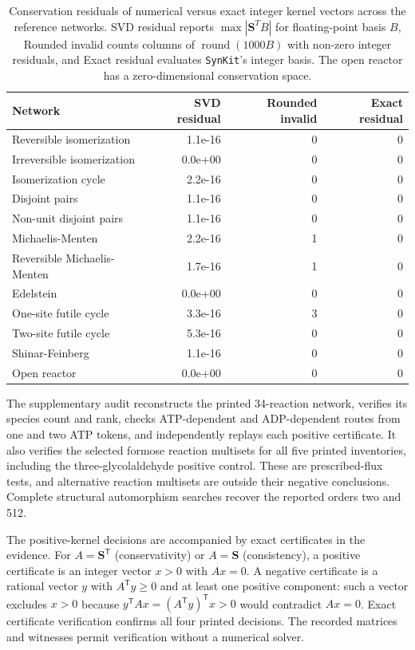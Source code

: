 \documentclass[pdflatex,referee]{../template/sn-jnl}
\theoremstyle{plain}%
\theoremstyle{definition}%
\theoremstyle{remark}%
\newcommand{\synkit}{\texttt{SynKit}\xspace}
\begin{document}
\begin{table}[htbp]
\centering
\caption{Conservation residuals of numerical versus exact integer kernel vectors across the reference networks. SVD residual reports $\max|\mathbf S^TB|$ for floating-point basis $B$, Rounded invalid counts columns of $\operatorname{round}(1000B)$ with non-zero integer residuals, and Exact residual evaluates \synkit's integer basis. The open reactor has a zero-dimensional conservation space.}
\label{tab:numerical_audit}
\small
\begin{tabular}{@{}lrrr@{}}
\toprule
Network & SVD residual & Rounded invalid & Exact residual\\
\midrule
Reversible isomerization & 1.1e-16 & 0 & 0 \\
Irreversible isomerization & 0.0e+00 & 0 & 0 \\
Isomerization cycle & 2.2e-16 & 0 & 0 \\
Disjoint pairs & 1.1e-16 & 0 & 0 \\
Non-unit disjoint pairs & 1.1e-16 & 0 & 0 \\
Michaelis-Menten & 2.2e-16 & 1 & 0 \\
Reversible Michaelis-Menten & 1.7e-16 & 1 & 0 \\
Edelstein & 0.0e+00 & 0 & 0 \\
One-site futile cycle & 3.3e-16 & 3 & 0 \\
Two-site futile cycle & 5.3e-16 & 0 & 0 \\
Shinar-Feinberg & 1.1e-16 & 0 & 0 \\
Open reactor & 0.0e+00 & 0 & 0 \\
\bottomrule
\end{tabular}
\end{table}

The supplementary audit reconstructs the printed 34-reaction network, verifies its species count and rank, checks ATP-dependent and ADP-dependent routes from one and two ATP tokens, and independently replays each positive certificate. It also verifies the selected formose reaction multisets for all five printed inventories, including the three-glycolaldehyde positive control. These are prescribed-flux tests, and alternative reaction multisets are outside their negative conclusions. Complete structural automorphism searches recover the reported orders two and 512.

The positive-kernel decisions are accompanied by exact certificates in the evidence. For $A=\mathbf S^{\mathsf T}$ (conservativity) or $A=\mathbf S$ (consistency), a positive certificate is an integer vector $x>0$ with $Ax=0$. A negative certificate is a rational vector $y$ with $A^{\mathsf T}y\ge0$ and at least one positive component: such a vector excludes $x>0$ because $y^{\mathsf T}Ax=(A^{\mathsf T}y)^{\mathsf T}x>0$ would contradict $Ax=0$. Exact certificate verification confirms all four printed decisions. The recorded matrices and witnesses permit verification without a numerical solver.
\end{document}
